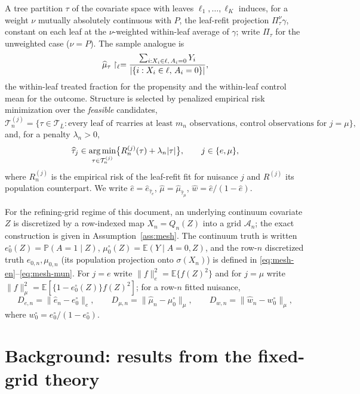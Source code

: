 \documentclass[11pt]{article}
\theoremstyle{plain}
\theoremstyle{definition}
\theoremstyle{remark}
\newcommand{\E}{\mathbb{E}}
\newcommand{\PP}{\mathbb{P}}
\newcommand{\cA}{\mathcal{A}}
\newcommand{\cT}{\mathcal{T}}
\newcommand{\ez}{e_0}
\newcommand{\mz}{\mu_0}
\newcommand{\ehat}{\widehat{e}}
\newcommand{\mhat}{\widehat{\mu}}
\newcommand{\what}{\widehat{w}}
\newcommand{\that}{\widehat{\tau}}
\DeclareMathOperator*{\argmin}{arg\,min}
\DeclarePairedDelimiter{\card}{\lvert}{\rvert}
\newcommand{\ezn}{e_{0,n}}
\newcommand{\mzn}{\mu_{0,n}}
\begin{document}
A tree partition $\tau$ of the covariate space with leaves
$\ell_1,\dots,\ell_K$ induces, for a weight $\nu$ mutually absolutely
continuous with $P$, the leaf-refit projection
$\Pi^\nu_\tau\gamma$, constant on each leaf at the $\nu$-weighted within-leaf
average of $\gamma$; write $\Pi_\tau$ for the unweighted case ($\nu=P$). The
sample analogue is
\begin{equation}\label{eq:refit}
  \mhat_\tau\restriction_\ell
  =\frac{\sum_{i:X_i\in\ell,\,A_i=0}Y_i}
        {\card{\{i:X_i\in\ell,\,A_i=0\}}},
\end{equation}
the within-leaf treated fraction for the propensity and the within-leaf
control mean for the outcome. Structure is selected by penalized empirical
risk minimization over the \emph{feasible} candidates,
\begin{equation}\label{eq:feasible}
  \cT^{(j)}_n=\bigl\{\tau\in\cT_{\bar L}:\text{every leaf of }\tau\text{
  carries at least }m_n\text{ observations, control observations for
  }j=\mu\bigr\},
\end{equation}
and, for a penalty $\lambda_n>0$,
\begin{equation}\label{eq:select}
  \that_j\in\argmin_{\tau\in\cT^{(j)}_n}
  \bigl\{R^{(j)}_n(\tau)+\lambda_n\card\tau\bigr\},
  \qquad j\in\{e,\mu\},
\end{equation}
where $R^{(j)}_n$ is the empirical risk of the leaf-refit fit for nuisance
$j$ and $R^{(j)}$ its population counterpart. We write
$\ehat=\ehat_{\that_e}$, $\mhat=\mhat_{\that_\mu}$, $\what=\ehat/(1-\ehat)$.

For the refining-grid regime of this document, an underlying continuum
covariate $Z$ is discretized by a row-indexed map $X_n=Q_n(Z)$ into a grid
$\cA_n$; the exact construction is given in Assumption~\ref{ass:mesh}. The
continuum truth is written $\ez^\circ(Z)=\PP(A=1\mid Z)$,
$\mz^\circ(Z)=\E(Y\mid A=0,Z)$, and the row-$n$ discretized truth
$\ezn,\mzn$ (its population projection onto $\sigma(X_n)$) is defined in
\eqref{eq:mesh-en}--\eqref{eq:mesh-mun}. For $j=e$ write $\|f\|_e^2=\E\{f(Z)^2\}$
and for $j=\mu$ write $\|f\|_\mu^2=\E[\{1-\ez^\circ(Z)\}f(Z)^2]$; for a
row-$n$ fitted nuisance,
\[
  D_{e,n}=\|\widehat e_n-\ez^\circ\|_e,
  \qquad
  D_{\mu,n}=\|\widehat\mu_n-\mz^\circ\|_\mu,
  \qquad
  D_{w,n}=\|\widehat w_n-w_0^\circ\|_\mu,
\]
where $w_0^\circ=\ez^\circ/(1-\ez^\circ)$.

\section{Background: results from the fixed-grid theory}\label{sec:background}
\end{document}
